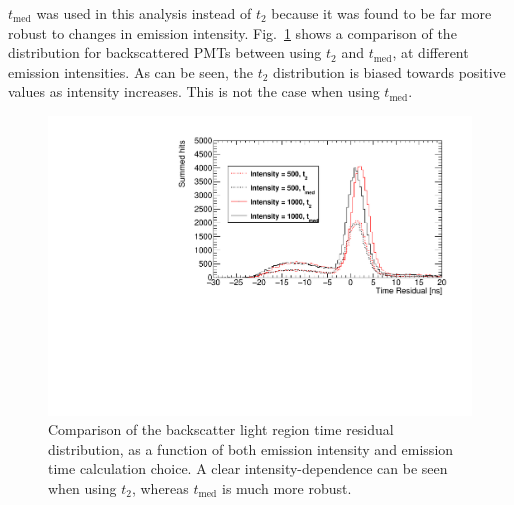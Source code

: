 $t_{\mathrm{med}}$ was used in this analysis instead of $t_{2}$ because it was found to be far more robust to changes in emission intensity. Fig.~\ref{fig:t2_temm_comparison} shows a comparison of the \tres{} distribution for backscattered PMTs between using $t_{2}$ and $t_{\mathrm{med}}$, at different emission intensities. As can be seen, the $t_{2}$ distribution is biased towards positive \tres{} values as intensity increases. This is not the case when using $t_{\mathrm{med}}$. 

\begin{figure}
    \centering
    \includegraphics[width=\textwidth]{5_SMELLIEAnalysis/images/t2_vs_tmed_backscatter_region_comparison_vs_intensity.pdf}
    \caption[Comparison of the backscatter light region time residual distribution with intensity and emission time calculation choice]
    {Comparison of the backscatter light region time residual distribution, as a function of both emission intensity and emission time calculation choice. A clear intensity-dependence can be seen when using $t_{2}$, whereas $t_{\mathrm{med}}$ is much more robust.}
    \label{fig:t2_temm_comparison}
\end{figure}



